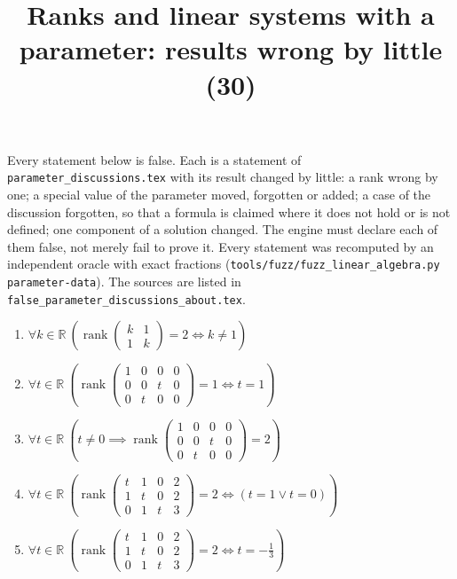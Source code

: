 \documentclass[11pt,a4paper]{article}
\title{Ranks and linear systems with a parameter: results wrong by little (30)}
\author{}
\date{}
\begin{document}
\maketitle
Every statement below is false. Each is a statement of \texttt{parameter\_discussions.tex} with its result changed by little: a rank wrong by one; a special value of the parameter moved, forgotten or added; a case of the discussion forgotten, so that a formula is claimed where it does not hold or is not defined; one component of a solution changed. The engine must declare each of them false, not merely fail to prove it. Every statement was recomputed by an independent oracle with exact fractions (\texttt{tools/fuzz/fuzz\_linear\_algebra.py parameter-data}). The sources are listed in \texttt{false\_parameter\_discussions\_about.tex}.

\begin{enumerate}
\item $\displaystyle \forall k \in \mathbb{R}\ \left( \operatorname{rank} \begin{pmatrix} k & 1 \\ 1 & k \end{pmatrix} = 2 \iff k \neq 1 \right)$
\item $\displaystyle \forall t \in \mathbb{R}\ \left( \operatorname{rank} \begin{pmatrix} 1 & 0 & 0 & 0 \\ 0 & 0 & t & 0 \\ 0 & t & 0 & 0 \end{pmatrix} = 1 \iff t = 1 \right)$
\item $\displaystyle \forall t \in \mathbb{R}\ \left( t \neq 0 \implies \operatorname{rank} \begin{pmatrix} 1 & 0 & 0 & 0 \\ 0 & 0 & t & 0 \\ 0 & t & 0 & 0 \end{pmatrix} = 2 \right)$
\item $\displaystyle \forall t \in \mathbb{R}\ \left( \operatorname{rank} \begin{pmatrix} t & 1 & 0 & 2 \\ 1 & t & 0 & 2 \\ 0 & 1 & t & 3 \end{pmatrix} = 2 \iff \left( t = 1 \lor t = 0 \right) \right)$
\item $\displaystyle \forall t \in \mathbb{R}\ \left( \operatorname{rank} \begin{pmatrix} t & 1 & 0 & 2 \\ 1 & t & 0 & 2 \\ 0 & 1 & t & 3 \end{pmatrix} = 2 \iff t = -\frac{1}{3} \right)$

\end{enumerate}
\end{document}
